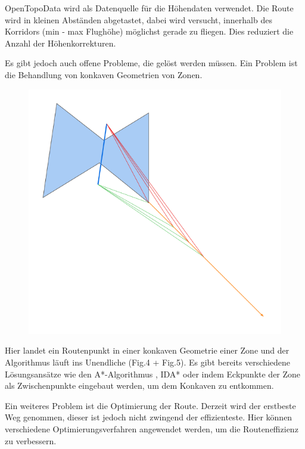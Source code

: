 OpenTopoData wird als Datenquelle für die Höhendaten verwendet. Die Route wird in kleinen Abständen abgetastet, dabei wird versucht, innerhalb des Korridors (min - max Flughöhe) möglichst gerade zu fliegen. Dies reduziert die Anzahl der Höhenkorrekturen.

Es gibt jedoch auch offene Probleme, die gelöst werden müssen. Ein Problem ist die Behandlung von konkaven Geometrien von Zonen.

\begin{figure}[!h]
    \begin{center}
        \includegraphics[scale=0.35]{images/konkaves-problem}
    \end{center}
\end{figure}

Hier landet ein Routenpunkt in einer konkaven Geometrie einer Zone und der Algorithmus läuft ins Unendliche (Fig.4 + Fig.5). Es gibt bereits verschiedene Lösungsansätze wie den A*-Algorithmus \cite{Algorithmus2022}, IDA* \cite{IDA2021} oder indem Eckpunkte der Zone als Zwischenpunkte eingebaut werden, um dem Konkaven zu entkommen.

Ein weiteres Problem ist die Optimierung der Route. Derzeit wird der erstbeste Weg genommen, dieser ist jedoch nicht zwingend der effizienteste. Hier können verschiedene Optimierungsverfahren angewendet werden, um die Routeneffizienz zu verbessern.

